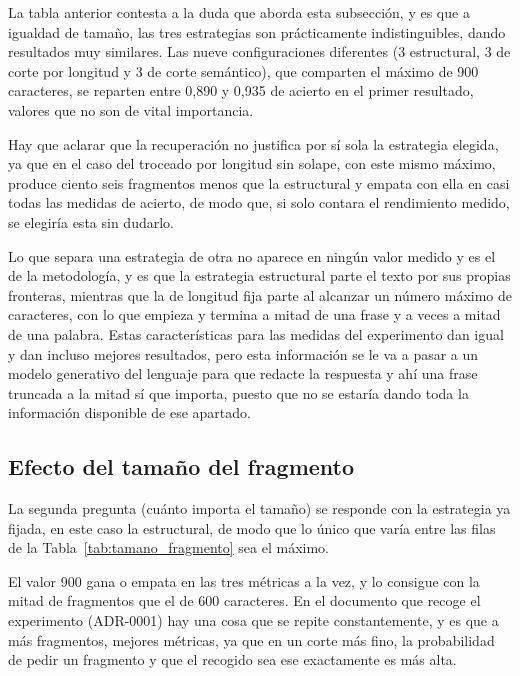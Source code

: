 La tabla anterior contesta a la duda que aborda esta subsección, y es que a igualdad de tamaño, las tres estrategias son prácticamente indistinguibles, dando resultados muy similares. Las nueve configuraciones diferentes (3 estructural, 3 de corte por longitud y 3 de corte semántico), que comparten el máximo de 900 caracteres, se reparten entre 0,890 y 0,935 de acierto en el primer resultado, valores que no son de vital importancia.

Hay que aclarar que la recuperación no justifica por sí sola la estrategia elegida, ya que en el caso del troceado por longitud sin solape, con este mismo máximo, produce ciento seis fragmentos menos que la estructural y empata con ella en casi todas las medidas de acierto, de modo que, si solo contara el rendimiento medido, se elegiría esta sin dudarlo.

Lo que separa una estrategia de otra no aparece en ningún valor medido y es el de la metodología, y es que la estrategia estructural parte el texto por sus propias fronteras, mientras que la de longitud fija parte al alcanzar un número máximo de caracteres, con lo que empieza y termina a mitad de una frase y a veces a mitad de una palabra. Estas características para las medidas del experimento dan igual y dan incluso mejores resultados, pero esta información se le va a pasar a un modelo generativo del lenguaje para que redacte la respuesta y ahí una frase truncada a la mitad sí que importa, puesto que no se estaría dando toda la información disponible de ese apartado.




\subsection[Efecto del tamaño del fragmento]{Efecto del tamaño del fragmento}
\label{secc:rejilla_tamano}

La segunda pregunta (cuánto importa el tamaño) se responde con la estrategia ya fijada, en este caso la estructural, de modo que lo único que varía entre las filas de la Tabla~\ref{tab:tamano_fragmento} sea el máximo. 




El valor 900 gana o empata en las tres métricas a la vez, y lo consigue con la mitad de fragmentos que el de 600 caracteres. En el documento que recoge el experimento (\mbox{ADR-0001}) hay una cosa que se repite constantemente, y es que a más fragmentos, mejores métricas, ya que en un corte más fino, la probabilidad de pedir un fragmento y que el recogido sea ese exactamente es más alta.

